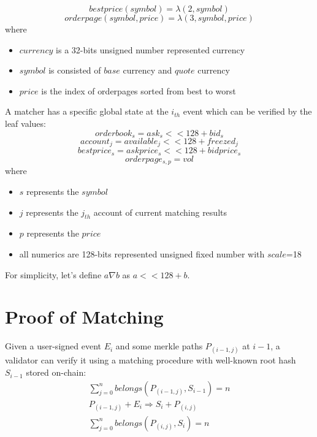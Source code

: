 \documentclass[a4paper,12pt]{article}
\begin{document}
\begin{equation*}
    bestprice(symbol) = \lambda(2, symbol)
\end{equation*}
\begin{equation*}
    orderpage(symbol, price) = \lambda(3, symbol, price)
\end{equation*}
where\\
\begin{itemize}
    \item $currency$ is a 32-bits unsigned number represented currency
    \item $symbol$ is consisted of $base$ currency and $quote$ currency
    \item $price$ is the index of orderpages sorted from best to worst
\end{itemize}

A matcher has a specific global state at the \(i_{th}\) event which can be verified by the leaf values:\\
\begin{equation*}
    orderbook_{s} = ask_{s} << 128 + bid_{s}
\end{equation*}
\begin{equation*}
    account_{j} = available_{j} << 128 + freezed_{j}
\end{equation*}
\begin{equation*}
    bestprice_{s} = askprice_{s} << 128 + bidprice_{s}
\end{equation*}
\begin{equation*}
    orderpage_{s, p} = vol
\end{equation*}
where\\
\begin{itemize}
  \item $s$ represents the $symbol$
  \item $j$ represents the $j_{th}$ account of current matching results
  \item $p$ represents the $price$
  \item all numerics are 128-bits represented unsigned fixed number with $scale$=18
\end{itemize}

For simplicity, let's define \(a \nabla b\) as \(a << 128 + b\).

\section{Proof of Matching}
\label{sec:org48d64ef}
Given a user-signed event \(E_{i}\) and some merkle paths \(P_{(i-1, j)}\) at \(i-1\), a validator can verify it using a matching procedure with well-known root hash \(S_{i-1}\) stored on-chain:\\
\begin{eqnarray*}
\sum\limits_{j=0}^{n} belongs(P_{(i-1, j)}, S_{i-1}) = n\\
P_{(i-1, j)} + E_{i} \Rightarrow S_{i} + P_{(i, j)} \\
\sum\limits_{j=0}^{n} belongs(P_{(i, j)}, S_{i}) = n
\end{eqnarray*}
\end{document}
